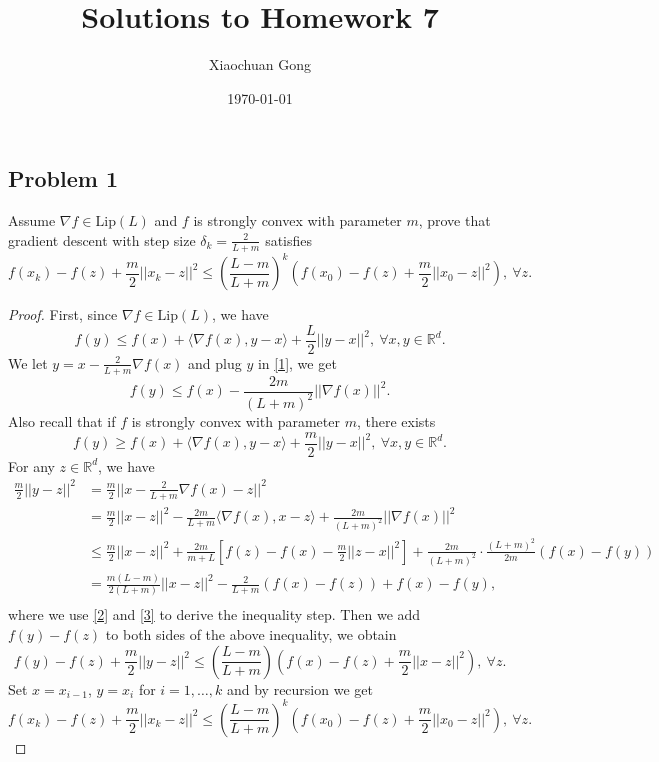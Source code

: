 \documentclass[11pt]{article}
\title{Solutions to Homework 7}
\author{Xiaochuan Gong}
\date\today
\begin{document}
\maketitle

\subsection*{Problem 1}
Assume $\nabla f\in\text{Lip}(L)$ and $f$ is strongly convex with parameter $m$, prove that gradient descent with step size $\delta_k=\frac{2}{L+m}$ satisfies 
\[
f(x_k)-f(z)+\frac{m}{2}||x_k-z||^2 \leq \left(\frac{L-m}{L+m}\right)^k\left(f(x_0)-f(z)+\frac{m}{2}||x_0-z||^2\right),\ \forall z.
\]

\begin{proof}
First, since $\nabla f\in\text{Lip}(L)$, we have 
\begin{equation}
    \label{1}
    f(y) \leq f(x)+\langle\nabla f(x),y-x\rangle+\frac{L}{2}||y-x||^2,\ \forall x,y\in\mathbb{R}^d. 
\end{equation}
We let $y=x-\frac{2}{L+m}\nabla f(x)$ and plug $y$ in \eqref{1}, we get
\begin{equation}
    \label{2}
    f(y) \leq f(x)-\frac{2m}{(L+m)^2}||\nabla f(x)||^2.
\end{equation}
Also recall that if $f$ is strongly convex with parameter $m$, there exists
\begin{equation}
    \label{3}
    f(y) \geq f(x)+\langle\nabla f(x),y-x\rangle+\frac{m}{2}||y-x||^2,\ \forall x,y\in\mathbb{R}^d. 
\end{equation}
For any $z\in\mathbb{R}^d$, we have
\begin{equation*}
    \begin{aligned}
        \frac{m}{2}||y-z||^2
        & = \frac{m}{2}||x-\frac{2}{L+m}\nabla f(x)-z||^2 \\
        & = \frac{m}{2}||x-z||^2 - \frac{2m}{L+m}\langle\nabla f(x),x-z\rangle + \frac{2m}{(L+m)^2}||\nabla f(x)||^2 \\
        & \leq \frac{m}{2}||x-z||^2 + \frac{2m}{m+L}\left[f(z)-f(x)-\frac{m}{2}||z-x||^2\right] + \frac{2m}{(L+m)^2}\cdot\frac{(L+m)^2}{2m}(f(x)-f(y)) \\
        & = \frac{m(L-m)}{2(L+m)}||x-z||^2 - \frac{2}{L+m}(f(x)-f(z)) + f(x)-f(y), \\
    \end{aligned}   
\end{equation*}
where  we use \eqref{2} and \eqref{3} to derive the inequality step. Then we add $f(y)-f(z)$ to both sides of the above inequality, we obtain
\[
f(y)-f(z)+\frac{m}{2}||y-z||^2 \leq \left(\frac{L-m}{L+m}\right)\left(f(x)-f(z)+\frac{m}{2}||x-z||^2\right),\ \forall z.
\]
Set $x=x_{i-1}$, $y=x_i$ for $i=1,\dots,k$ and by recursion we get
\[
f(x_k)-f(z)+\frac{m}{2}||x_k-z||^2 \leq \left(\frac{L-m}{L+m}\right)^k\left(f(x_0)-f(z)+\frac{m}{2}||x_0-z||^2\right),\ \forall z.
\]
\end{proof}
\end{document}
